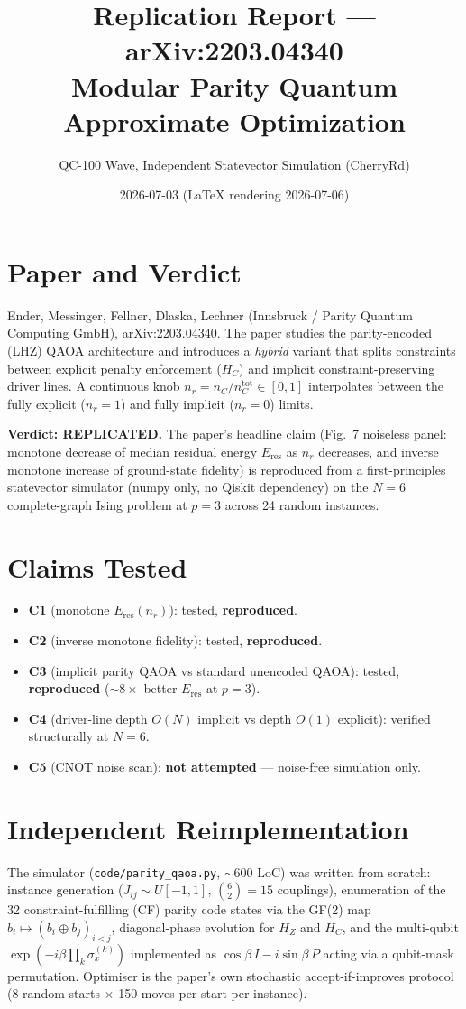 \documentclass[11pt]{article}
\title{Replication Report --- arXiv:2203.04340\\\large Modular Parity Quantum Approximate Optimization}
\author{QC-100 Wave, Independent Statevector Simulation (CherryRd)}
\date{2026-07-03 (LaTeX rendering 2026-07-06)}
\begin{document}
\maketitle

\section{Paper and Verdict}
Ender, Messinger, Fellner, Dlaska, Lechner (Innsbruck / Parity Quantum
Computing GmbH), arXiv:2203.04340. The paper studies the parity-encoded
(LHZ) QAOA architecture and introduces a \emph{hybrid} variant that
splits constraints between explicit penalty enforcement ($H_C$) and
implicit constraint-preserving driver lines. A continuous knob
$n_r=n_C/n_C^{\mathrm{tot}}\in[0,1]$ interpolates between the fully
explicit ($n_r=1$) and fully implicit ($n_r=0$) limits.

\textbf{Verdict: REPLICATED.} The paper's headline claim
(Fig.~7 noiseless panel: monotone decrease of median residual energy
$E_{\mathrm{res}}$ as $n_r$ decreases, and inverse monotone increase
of ground-state fidelity) is reproduced from a first-principles
statevector simulator (numpy only, no Qiskit dependency) on the
$N=6$ complete-graph Ising problem at $p=3$ across 24 random instances.

\section{Claims Tested}
\begin{itemize}
\item \textbf{C1} (monotone $E_{\mathrm{res}}(n_r)$): tested, \textbf{reproduced}.
\item \textbf{C2} (inverse monotone fidelity): tested, \textbf{reproduced}.
\item \textbf{C3} (implicit parity QAOA vs standard unencoded QAOA): tested, \textbf{reproduced} ($\sim 8\times$ better $E_{\mathrm{res}}$ at $p=3$).
\item \textbf{C4} (driver-line depth $O(N)$ implicit vs depth $O(1)$ explicit): verified structurally at $N=6$.
\item \textbf{C5} (CNOT noise scan): \textbf{not attempted} --- noise-free simulation only.
\end{itemize}

\section{Independent Reimplementation}
The simulator (\texttt{code/parity\_qaoa.py}, $\sim 600$ LoC) was written
from scratch: instance generation ($J_{ij}\sim U[-1,1]$, $\binom{6}{2}=15$
couplings), enumeration of the 32 constraint-fulfilling (CF) parity code
states via the GF(2) map $b_i \mapsto (b_i\oplus b_j)_{i<j}$,
diagonal-phase evolution for $H_Z$ and $H_C$, and the multi-qubit
$\exp(-i\beta\prod_k \sigma_x^{(k)})$ implemented as
$\cos\beta\,I - i\sin\beta\,P$ acting via a qubit-mask permutation.
Optimiser is the paper's own stochastic accept-if-improves protocol
(8 random starts $\times$ 150 moves per start per instance).
\end{document}
